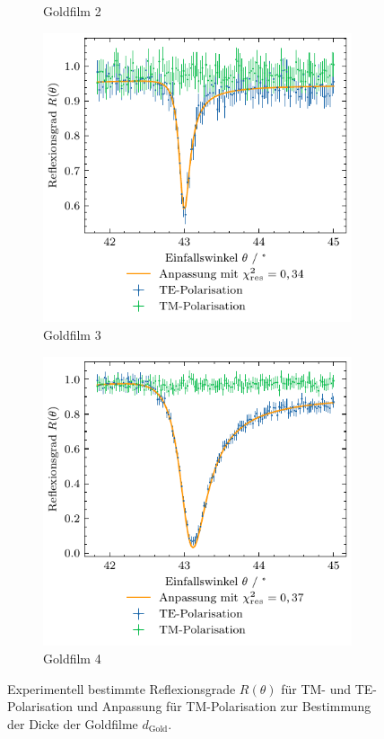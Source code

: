 \begin{figure}[H]
\begin{subfigure}{0.45\textwidth}
        \caption{Goldfilm 2}
    \end{subfigure}
    \begin{subfigure}{0.45\textwidth}
        \centering
        \includegraphics[width=\linewidth]{../figs/gold3_ppol_fit}
        \caption{Goldfilm 3}
    \end{subfigure}
    \begin{subfigure}{0.45\textwidth}
        \centering
        \includegraphics[width=\linewidth]{../figs/gold4_ppol_fit}
        \caption{Goldfilm 4}
    \end{subfigure}
    \caption{Experimentell bestimmte Reflexionsgrade $R(\theta)$ für TM- und TE-Polarisation und Anpassung für TM-Polarisation
    zur Bestimmung der Dicke der Goldfilme $d_{\mathrm{Gold}}$.}\label{fig:gold_fit}
\end{figure}
